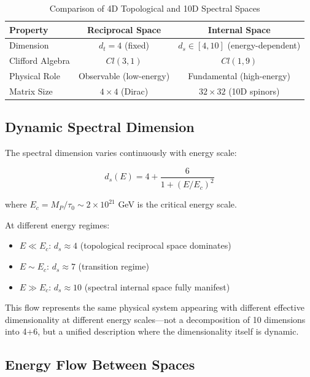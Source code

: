 \begin{table}[htbp]
\centering
\caption{Comparison of 4D Topological and 10D Spectral Spaces}
\begin{tabular}{@{}lcc@{}}
\toprule
\textbf{Property} & \textbf{Reciprocal Space} & \textbf{Internal Space} \\
\midrule
Dimension & $d_t = 4$ (fixed) & $d_s \in [4, 10]$ (energy-dependent) \\
Clifford Algebra & $Cl(3,1)$ & $Cl(1,9)$ \\
Physical Role & Observable (low-energy) & Fundamental (high-energy) \\
Matrix Size & $4 \times 4$ (Dirac) & $32 \times 32$ (10D spinors) \\
\bottomrule
\end{tabular}
\label{tab:space_comparison}
\end{table}

\subsection{Dynamic Spectral Dimension}

The spectral dimension varies continuously with energy scale:

\begin{equation}
    d_s(E) = 4 + \frac{6}{1 + (E/E_c)^2}
\end{equation}

where $E_c = M_P / \tau_0 \sim 2 \times 10^{21}$ GeV is the critical energy scale.

At different energy regimes:
\begin{itemize}
    \item $E \ll E_c$: $d_s \approx 4$ (topological reciprocal space dominates)
    \item $E \sim E_c$: $d_s \approx 7$ (transition regime)
    \item $E \gg E_c$: $d_s \approx 10$ (spectral internal space fully manifest)
\end{itemize}

This flow represents the same physical system appearing with different effective dimensionality at different energy scales—not a decomposition of 10 dimensions into 4+6, but a unified description where the dimensionality itself is dynamic.

\subsection{Energy Flow Between Spaces}

